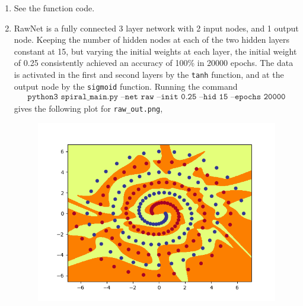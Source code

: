 \documentclass[a4paper,11pt]{article}
\newcommand{\code}{\texttt}
\begin{document}
{{\begin{enumerate}[leftmargin=*]
		\item See the function code.
		\item RawNet is a fully connected 3 layer network with 2 input nodes, and 1 output node. Keeping the number of hidden nodes at each of the two hidden layers constant at 15, but varying the initial weights at each layer, the initial weight of 0.25 consistently achieved an accuracy of 100\% in 20000 epochs. The data is activated in the first and second layers by the \code{tanh} function, and at the output node by the \code{sigmoid} function. Running the command
			\begin{align*}
				\code{python3 spiral\_main.py --net raw --init 0.25 --hid 15 --epochs 20000}
			\end{align*}
			gives the following plot for \code{raw\_out.png},
			\begin{figure}[!ht]
				\includegraphics[width=\linewidth]{rawout.png}
			\end{figure}


\end{enumerate}}}
\end{document}

